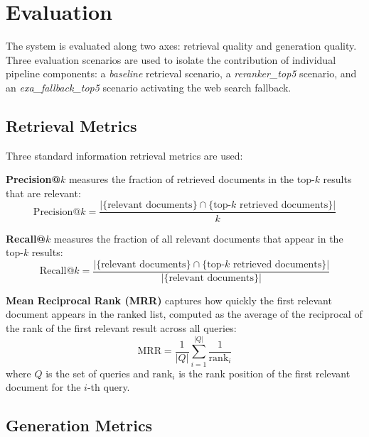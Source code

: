 \documentclass[12pt, a4paper]{article}
\begin{document}
\section{Evaluation}

The system is evaluated along two axes: retrieval quality and generation quality.
Three evaluation scenarios are used to isolate the contribution of individual
pipeline components: a \textit{baseline} retrieval scenario, a
\textit{reranker\_top5} scenario, and an \textit{exa\_fallback\_top5} scenario
activating the web search fallback.

\subsection{Retrieval Metrics}

Three standard information retrieval metrics are used:

\textbf{Precision@$k$} measures the fraction of retrieved documents in the
top-$k$ results that are relevant:
\begin{equation}
  \text{Precision@}k = \frac{|\{\text{relevant documents}\} \cap \{\text{top-}k \text{ retrieved documents}\}|}{k}
\end{equation}

\textbf{Recall@$k$} measures the fraction of all relevant documents that appear
in the top-$k$ results:
\begin{equation}
  \text{Recall@}k = \frac{|\{\text{relevant documents}\} \cap \{\text{top-}k \text{ retrieved documents}\}|}{|\{\text{relevant documents}\}|}
\end{equation}

\textbf{Mean Reciprocal Rank (MRR)} captures how quickly the first relevant
document appears in the ranked list, computed as the average of the reciprocal
of the rank of the first relevant result across all queries:
\begin{equation}
  \mathrm{MRR} = \frac{1}{|Q|} \sum_{i=1}^{|Q|} \frac{1}{\mathrm{rank}_i}
\end{equation}
where $Q$ is the set of queries and $\mathrm{rank}_i$ is the rank position of the first relevant document for the $i$-th query.

\subsection{Generation Metrics}
\end{document}
